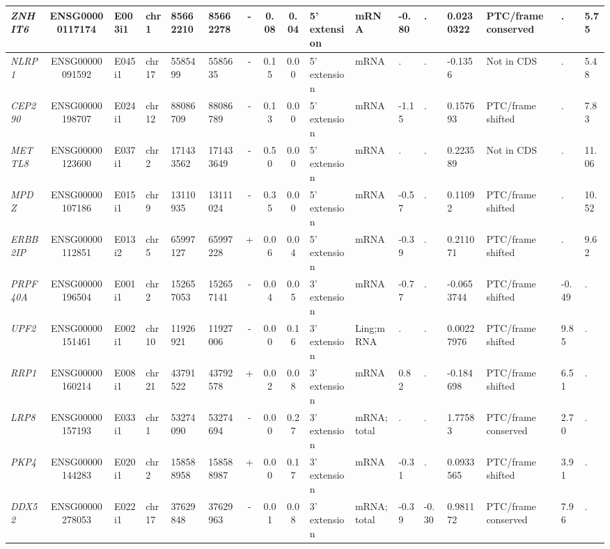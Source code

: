 \begin{appendices}
\begin{landscape}
\begin{table}
{\begin{tabular}{|l|c|l|l|l|l|c|c|c|l|l|l|l|l|l|l|l|}
		\textit{ZNHIT6} & ENSG00000117174 & E003i1 & chr1  & 85662210 & 85662278 & -     & 0.08  & 0.04  & 5' extension & mRNA  & -0.80 & . & 0.0230322 & PTC/frame conserved & . &  5.75 \\ \hline
		\textit{NLRP1} & ENSG00000091592 & E045i1 & chr17 & 5585499 & 5585635 & -     & 0.15  & 0.00  & 5' extension & mRNA  & . & . & -0.1356 & Not in CDS     & . &  5.48 \\ \hline
		\textit{CEP290} & ENSG00000198707 & E024i1 & chr12 & 88086709 & 88086789 & -     & 0.13  & 0.00  & 5' extension & mRNA  & -1.15 & . & 0.157693 & PTC/frame shifted & . &  7.83 \\ \hline
		\textit{METTL8} & ENSG00000123600 & E037i1 & chr2  & 171433562 & 171433649 & -     & 0.50  & 0.00  & 5' extension & mRNA  & . & . & 0.223589 & Not in CDS     & . &  11.06 \\ \hline
		\textit{MPDZ} & ENSG00000107186 & E015i1 & chr9  & 13110935 & 13111024 & -     & 0.35  & 0.00  & 5' extension & mRNA  & -0.57 & . & 0.11092 & PTC/frame shifted & . &  10.52 \\ \hline
		\textit{ERBB2IP} & ENSG00000112851 & E013i2 & chr5  & 65997127 & 65997228 & +     & 0.06  & 0.04  & 5' extension & mRNA  & -0.39 & . & 0.211071 & PTC/frame shifted & . &  9.62 \\ \hline
		\textit{PRPF40A} & ENSG00000196504 & E001i1 & chr2  & 152657053 & 152657141 & -     & 0.04  & 0.05  & 3' extension & mRNA  & -0.77 & . & -0.0653744 & PTC/frame shifted & -0.49 & . \\ \hline
		\textit{UPF2} & ENSG00000151461 & E002i1 & chr10 & 11926921 & 11927006 & -     & 0.00  & 0.16  & 3' extension & Ling;mRNA & . & . & 0.00227976 & PTC/frame shifted & 9.85  & . \\ \hline
		\textit{RRP1} & ENSG00000160214 & E008i1 & chr21 & 43791522 & 43792578 & +     & 0.02  & 0.08  & 3' extension & mRNA  & 0.82  & . & -0.184698 & PTC/frame shifted & 6.51  & . \\ \hline
		\textit{LRP8} & ENSG00000157193 & E033i1 & chr1  & 53274090 & 53274694 & -     & 0.00  & 0.27  & 3' extension & mRNA;total & . & . & 1.77583 & PTC/frame conserved & 2.70  & . \\ \hline
		\textit{PKP4} & ENSG00000144283 & E020i1 & chr2  & 158588958 & 158588987 & +     & 0.00  & 0.17  & 3' extension & mRNA  & -0.31 & . & 0.0933565 & PTC/frame shifted & 3.91  & . \\ \hline
		\textit{DDX52} & ENSG00000278053 & E022i1 & chr17 & 37629848 & 37629963 & -     & 0.01  & 0.08  & 3' extension & mRNA;total & -0.39 & -0.30 & 0.981172 & PTC/frame conserved & 7.96  & . \\ \hline

\end{tabular}}
\end{table}
\end{landscape}
\end{appendices}
